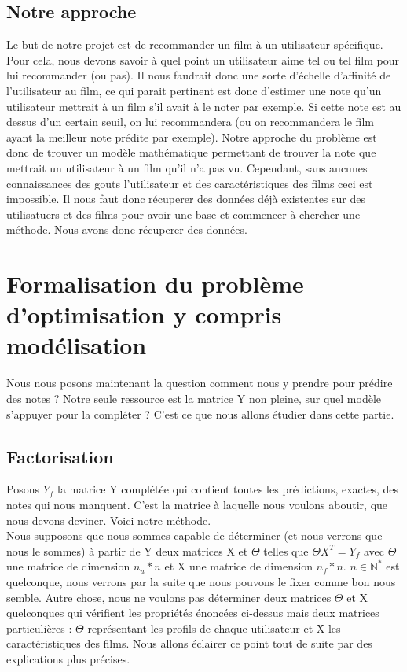 \documentclass[a4paper,10pt]{article}
\begin{document}
\subsection{Notre approche}
Le but de notre projet est de recommander un film à un utilisateur spécifique.  
Pour cela, nous devons savoir à quel point un utilisateur aime tel ou tel film pour lui recommander (ou pas).  
Il nous faudrait donc une sorte d'échelle d'affinité de l'utilisateur au film, ce qui parait pertinent est donc d'estimer une note qu'un utilisateur mettrait à un film s'il avait à le noter par exemple.  
Si cette note est au dessus d'un certain seuil, on lui recommandera (ou on recommandera le film ayant la meilleur note prédite par exemple).  
Notre approche du problème est donc de trouver un modèle mathématique permettant de trouver la note que mettrait un utilisateur à un film qu'il n'a pas vu.  
Cependant, sans aucunes connaissances des gouts l'utilisateur et des caractéristiques des films ceci est impossible. Il nous faut donc récuperer des données déjà existentes sur des utilisatuers et des films pour avoir une base et commencer à chercher une méthode.   
Nous avons donc récuperer des données.

\subsection{}
\section{Formalisation du problème d'optimisation y compris modélisation}

Nous nous posons maintenant la question comment nous y prendre pour prédire des notes ?
Notre seule ressource est la matrice Y non pleine, sur quel modèle s'appuyer pour la compléter ?
C'est ce que nous allons étudier dans cette partie.

\subsection{Factorisation}

Posons $Y_f$ la matrice Y complétée qui contient toutes les prédictions, exactes, des notes qui nous manquent. C'est la matrice à laquelle nous voulons aboutir, que nous devons deviner. Voici notre méthode.\\

Nous supposons que nous sommes capable de déterminer (et nous verrons que nous le sommes) à partir de Y deux matrices X et $\Theta$ telles que $\Theta X^T = Y_f$ avec $\Theta$ une matrice de dimension $n_u * n$ et X une matrice de dimension $n_f * n$. $n \in \mathbb{N}^*$ est quelconque, nous verrons par la suite que nous pouvons le fixer comme bon nous semble.
Autre chose, nous ne voulons pas déterminer deux matrices $\Theta$ et X quelconques qui vérifient les propriétés énoncées ci-dessus mais deux matrices particulières : $\Theta$ représentant les profils de chaque utilisateur et X les caractéristiques des films. Nous allons éclairer ce point tout de suite par des explications plus précises.\\
\end{document}

